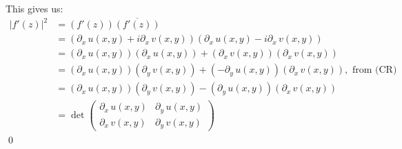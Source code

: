 \documentclass[a4paper, titlepage, DIV=14]{scrartcl}
\begin{document}
\begin{enumerate}[(i)]
        This gives us:
        \begin{align*}
            |f'(z)|^{2} &= (f'(z))\overline{(f'(z))} \\
                &= (\partial_{x} \, u(x,y) + i\partial_{x} \, v(x,y)) (\partial_{x} \, u(x,y) - i\partial_{x} \, v(x,y)) \\
                &= (\partial_{x} \, u(x,y))(\partial_{x} \, u(x,y)) + (\partial_{x} \, v(x,y))(\partial_{x} \, v(x,y)) \\
                &= (\partial_{x} \, u(x,y))(\partial_{y} \, v(x,y)) + (-\partial_{y} \, u(x,y))(\partial_{x} \, v(x,y)), \text{ from (CR)} \\
                &= (\partial_{x} \, u(x,y))(\partial_{y} \, v(x,y)) - (\partial_{y} \, u(x,y))(\partial_{x} \, v(x,y)) \\
                &= \det 
                \begin{pmatrix}
                    \partial_{x} \, u(x,y) & \partial_{y} \, u(x,y) \\
                    \partial_{x} \, v(x,y) & \partial_{y} \, v(x,y)
                \end{pmatrix} 
        \end{align*}\qed \\
        

\end{enumerate}
\end{document}
